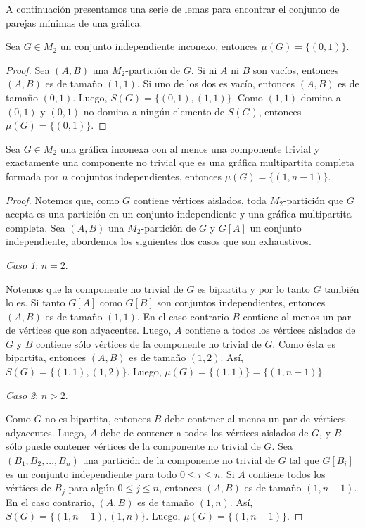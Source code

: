 A continuación presentamos una serie de lemas para encontrar el conjunto de parejas mínimas de una gráfica. 

\begin{lemma}\label{lema_parejas_01}
Sea $G\in M_2$ un conjunto independiente inconexo, entonces $\mu(G)=\{(0,1)\}$.
\end{lemma}

\begin{proof}
Sea $(A,B)$ una $M_2$-partición de $G$. Si ni $A$ ni $B$ son vacíos, entonces $(A,B)$ es de tamaño $(1,1)$. Si uno de los dos es vacío, entonces $(A,B)$ es de tamaño $(0,1)$. Luego, $S(G)=\{(0,1),(1,1)\}$. Como $(1,1)$ domina a $(0,1)$ y $(0,1)$ no domina a ningún elemento de $S(G)$, entonces $\mu(G)=\{(0,1)\}$.
\end{proof}

\begin{lemma}\label{lema_parejas_02}
Sea $G\in M_2$ una gráfica inconexa con al menos una componente trivial y exactamente una componente no trivial que es una gráfica multipartita completa formada por $n$ conjuntos independientes, entonces $\mu(G)=\{(1,n-1)\}$.
\end{lemma}

\begin{proof}
Notemos que, como $G$ contiene vértices aislados, toda $M_2$-partición que $G$ acepta es una partición en un conjunto independiente y una gráfica multipartita completa. Sea $(A,B)$ una $M_2$-partición de $G$ y $G[A]$ un conjunto independiente, abordemos los siguientes dos casos que son exhaustivos.

\emph{Caso 1}: $n = 2$. 

Notemos que la componente no trivial de $G$ es bipartita y por lo tanto $G$ también lo es. Si tanto $G[A]$ como $G[B]$ son conjuntos independientes, entonces $(A,B)$ es de tamaño $(1,1)$. En el caso contrario $B$ contiene al menos un par de vértices que son adyacentes. Luego, $A$ contiene a todos los vértices aislados de $G$ y $B$ contiene sólo vértices de la componente no trivial de $G$. Como ésta es bipartita, entonces $(A,B)$ es de tamaño $(1,2)$. Así, $S(G)=\{(1,1),(1,2)\}$. Luego, $\mu(G)=\{(1,1)\} = \{(1,n-1)\}$.

\emph{Caso 2}: $n > 2$.

Como $G$ no es bipartita, entonces $B$ debe contener al menos un par de vértices adyacentes. Luego, $A$ debe de contener a todos los vértices aislados de $G$, y $B$ sólo puede contener vértices de la componente no trivial de $G$. Sea $(B_1, B_2, \dots, B_n)$ una partición de la componente no trivial de $G$ tal que $G[B_i]$ es un conjunto independiente para todo $0\le i \le n$. Si $A$ contiene todos los vértices de $B_j$ para algún $0\le j \le n$, entonces $(A,B)$ es de tamaño $(1,n-1)$. En el caso contrario, $(A,B)$ es de tamaño $(1,n)$. Así, $S(G)=\{(1,n-1),(1,n)\}$. Luego, $\mu(G)=\{(1,n-1)\}$.

\end{proof}

